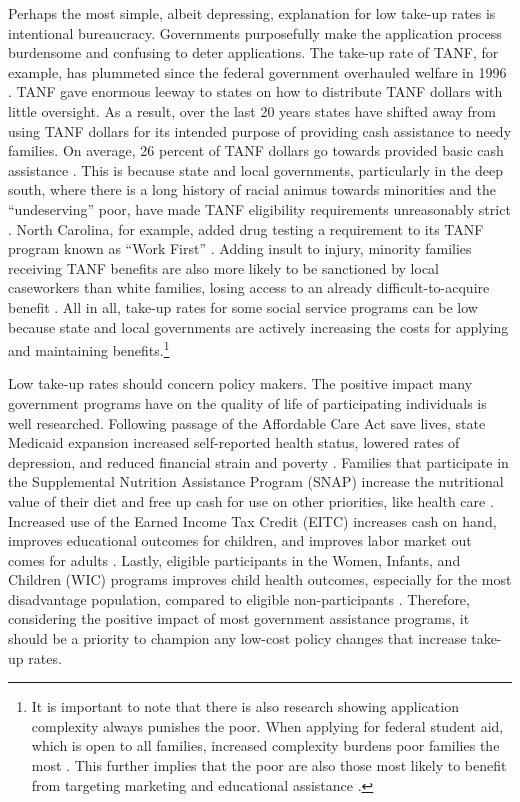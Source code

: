 \documentclass[12pt,letterpaperpaper,]{book}
\begin{document}
Perhaps the most simple, albeit depressing, explanation for low take-up
rates is intentional bureaucracy. Governments purposefully make the
application process burdensome and confusing to deter applications. The
take-up rate of TANF, for example, has plummeted since the federal
government overhauled welfare in 1996 \citep{ribar_how_2014}. TANF gave
enormous leeway to states on how to distribute TANF dollars with little
oversight. As a result, over the last 20 years states have shifted away
from using TANF dollars for its intended purpose of providing cash
assistance to needy families. On average, 26 percent of TANF dollars go
towards provided basic cash assistance \citep{schott_how_2015}. This is
because state and local governments, particularly in the deep south,
where there is a long history of racial animus towards minorities and
the ``undeserving'' poor, have made TANF eligibility requirements
unreasonably strict \citep{keiser_race_2004}. North Carolina, for
example, added drug testing a requirement to its TANF program known as
``Work First'' \citep{lynn_bonner_nc_2016}. Adding insult to injury,
minority families receiving TANF benefits are also more likely to be
sanctioned by local caseworkers than white families, losing access to an
already difficult-to-acquire benefit \citep{monnat_color_2010}. All in
all, take-up rates for some social service programs can be low because
state and local governments are actively increasing the costs for
applying and maintaining benefits.\footnote{It is important to note that
  there is also research showing application complexity always punishes
  the poor. When applying for federal student aid, which is open to all
  families, increased complexity burdens poor families the most
  \citep{dynarski_cost_2006}. This further implies that the poor are
  also those most likely to benefit from targeting marketing and
  educational assistance \citep{bertrand_behavioral_2006}.}

Low take-up rates should concern policy makers. The positive impact many
government programs have on the quality of life of participating
individuals is well researched. Following passage of the Affordable Care
Act save lives, state Medicaid expansion increased self-reported health
status, lowered rates of depression, and reduced financial strain and
poverty
\citep{baicker_oregon_2013, sommers_mortality_2012, sommers_poverty-reducing_2013}.
Families that participate in the Supplemental Nutrition Assistance
Program (SNAP) increase the nutritional value of their diet and free up
cash for use on other priorities, like health care
\citep{bartfeld_snap_2015, sonik_massachusetts_2016, miller_using_2017}.
Increased use of the Earned Income Tax Credit (EITC) increases cash on
hand, improves educational outcomes for children, and improves labor
market out comes for adults
\citep{grogger_effects_2003, bhargava_why_2012, dahl_impact_2012}.
Lastly, eligible participants in the Women, Infants, and Children (WIC)
programs improves child health outcomes, especially for the most
disadvantage population, compared to eligible non-participants
\citep{bitler_does_2005}. Therefore, considering the positive impact of
most government assistance programs, it should be a priority to champion
any low-cost policy changes that increase take-up rates.
\end{document}
